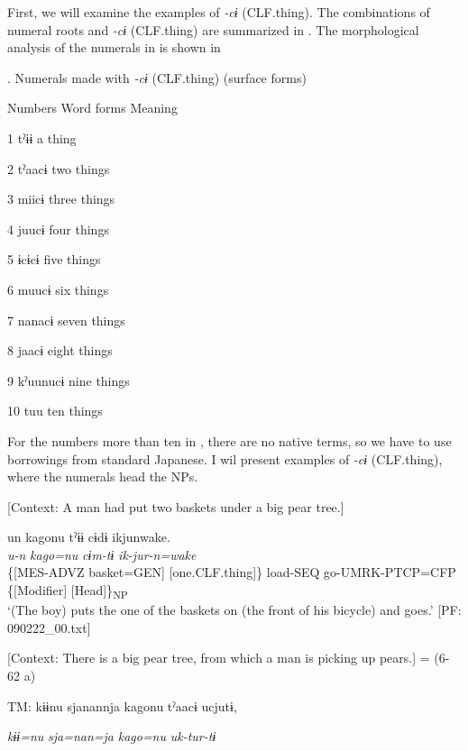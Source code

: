 First, we will examine the examples of \textit{{}-cɨ} (CLF.thing). The combinations of numeral roots and \textit{{}-cɨ} (CLF.thing) are summarized in . The morphological analysis of the numerals in  is shown in 

\begin{styleBeschriftung}
\textmd{}\textmd{. Numerals made with}\textmd{ \textit{-cɨ}}\textmd{ (CLF.thing) (surface forms)}
\end{styleBeschriftung}

Numbers  Word forms  Meaning

1  tˀɨɨ  a thing

2  tˀaacɨ  two things

3  miicɨ  three things

4  juucɨ  four things

5  ɨcɨcɨ  five things

6  muucɨ  six things

7  nanacɨ  seven things

8  jaacɨ  eight things

9  kˀuunucɨ  nine things

10  tuu  ten things

For the numbers more than ten in , there are no native terms, so we have to use borrowings from standard Japanese. I wil present examples of \textit{{}-cɨ} (CLF.thing), where the numerals head the NPs.

\ea \label{ex:7:12}
\ea \label{ex:7:12a} [Context: A man had put two baskets under a big pear tree.]

\gllll  un  kagonu  tˀɨɨ  cɨdɨ   ikjunwake.\\
\textit{u-n}  \textit{kago=nu}  \textit{}  \textit{cɨm-tɨ} \textit{ik-jur-n=wake}\\
\{[MES-ADVZ  basket=GEN]  [one.CLF.thing]\}  load-SEQ          go-UMRK-PTCP=CFP\\
\{[Modifier]    [Head]\}\textsubscript{NP}  \\
\glt ‘(The boy) puts the one of the baskets on (the front of his bicycle) and goes.’ [PF: 090222\_00.txt]

\ex \label{ex:7:12b}[Context: There is a big pear tree, from which a man is picking up pears.] = (6-62 a)

    TM:  kɨɨnu  sjanannja  kagonu  tˀaacɨ  ucjutɨ,

      \textit{kɨɨ=nu}  \textit{sja=nan=ja}  \textit{kago=nu}  \textit{}  \textit{uk-tur-tɨ}
                                                                              
